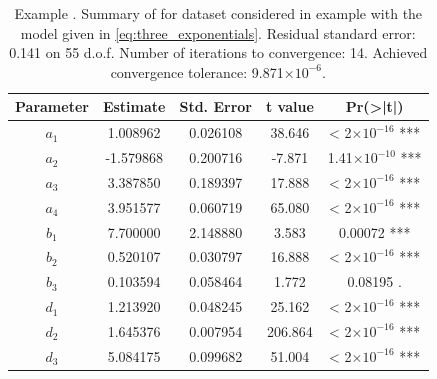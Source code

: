 \begin{table}[htb]
\centering
\begin{tabular}{ccccc}
\toprule
Parameter &  Estimate & Std. Error & t value & Pr(>|t|)\\   \midrule     
$a_1$ & 1.008962  & 0.026108 & 38.646 & < 2$\times 10^{-16}$ ***\\
$a_2$ & -1.579868 &  0.200716 & -7.871 & 1.41$\times 10^{-10}$ ***\\
$a_3$ & 3.387850  & 0.189397 & 17.888 & < 2$\times 10^{-16}$ ***\\
$a_4$ & 3.951577  & 0.060719 & 65.080 & < 2$\times 10^{-16}$ ***\\
$b_1$ & 7.700000  & 2.148880 &  3.583 & 0.00072 ***\\
$b_2$ & 0.520107  & 0.030797 & 16.888 & < 2$\times 10^{-16}$ ***\\
$b_3$ & 0.103594  & 0.058464 &  1.772 & 0.08195 .  \\
$d_1$ & 1.213920  & 0.048245 & 25.162 & < 2$\times 10^{-16}$ ***\\
$d_2$ & 1.645376  & 0.007954 & 206.864 & < 2$\times 10^{-16}$ ***\\
$d_3$ & 5.084175  & 0.099682 & 51.004 & < 2$\times 10^{-16}$ ***\\
\bottomrule
\end{tabular} 
\caption{Example . Summary of  for dataset considered in example  with the model given in \eqref{eq:three_exponentials}. Residual standard error: 0.141 on 55 d.o.f. Number of iterations to convergence: 14. Achieved convergence tolerance:  9.871$\times 10^{-6}$.}
\label{t:three_exponentials_summary_TAC}
\end{table}







